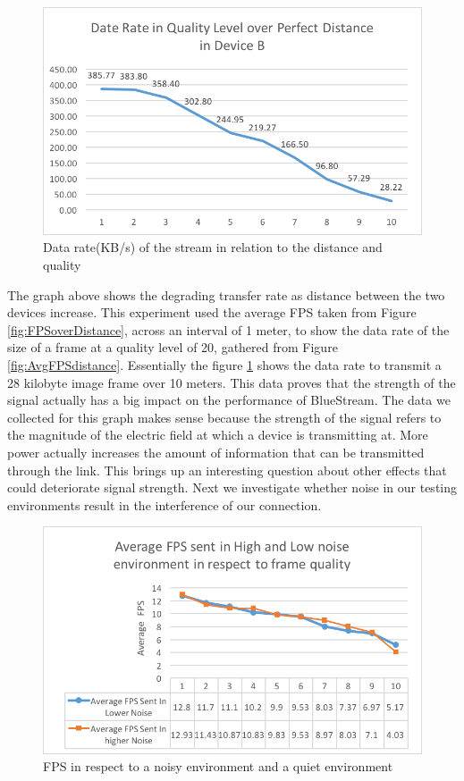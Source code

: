 \documentclass[a4paper,12pt]{article}
\begin{document}
\begin{figure}[h!]
\centering
\includegraphics[scale=1]{Figures/Figure16.png}
\caption{Data rate(KB/s) of the stream in relation to the distance and quality}
\label{fig:DataRateDistance}
\end{figure}

The graph above shows the degrading transfer rate as distance between the two devices increase. This experiment used the average FPS taken from Figure \ref{fig:FPSoverDistance}, across an interval of 1 meter, to show the data rate of the size of a frame at a quality level of 20, gathered from Figure \ref{fig:AvgFPSdistance}. Essentially the figure \ref{fig:DataRateDistance} shows the data rate to transmit a 28 kilobyte image frame over 10 meters. This data proves that the strength of the signal actually has a big impact on the performance of BlueStream. The data we collected for this graph makes sense because the strength of the signal refers to the magnitude of the electric field at which a device is transmitting at. More power actually increases the amount of information that can be transmitted through the link. This brings up an interesting question about other effects that could deteriorate signal strength. Next we investigate whether noise in our testing environments result in the interference of our connection.

\begin{figure}[h!]
\centering
\includegraphics[scale=1]{Figures/Figure17.png}
\caption{FPS in respect to a noisy environment and a quiet environment}
\label{fig:FPSinNoisy}
\end{figure}
\end{document}
